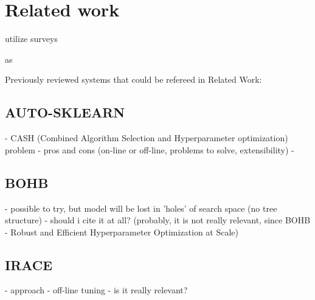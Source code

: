 \chapter{Related work}\label{relwork}
utilize surveys 

as \cite{surv:drake2019recent}

Previously reviewed systems that could be refereed in Related Work: \cite{surv:kerschke2019automated}
\section{AUTO-SKLEARN}
- CASH (Combined Algorithm Selection and Hyperparameter optimization) problem
- pros and cons (on-line or off-line, problems to solve, extensibility)
- \cite{autosklearn:feurer2015efficient}

\section{BOHB}
- possible to try, but model will be lost in 'holes' of search space (no tree structure)
- should i cite it at all? (probably, it is not really relevant, since BOHB - Robust and Efficient Hyperparameter Optimization at Scale)

\section{IRACE}
- approach \cite{irace:lopez2016irace}
- off-line tuning
- is it really relevant?

